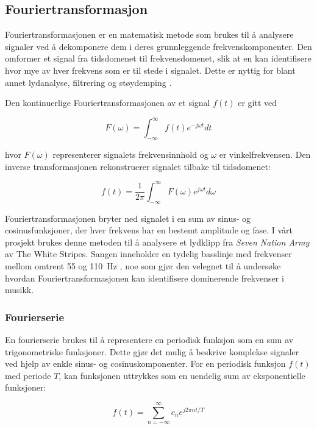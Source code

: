 \subsection{Fouriertransformasjon}

Fouriertransformasjonen er en matematisk metode som brukes til å analysere 
signaler ved å dekomponere dem i deres grunnleggende frekvenskomponenter. 
Den omformer et signal fra tidsdomenet til frekvensdomenet, slik at en kan 
identifisere hvor mye av hver frekvens som er til stede i signalet. Dette er 
nyttig for blant annet lydanalyse, filtrering og støydemping \parencite{geeksforgeeks_fourier}.

Den kontinuerlige Fouriertransformasjonen av et signal $f(t)$ er gitt ved

\begin{equation*}
    F(\omega) = \int_{-\infty}^{\infty} f(t)e^{-j\omega t}dt
\end{equation*}

hvor $F(\omega)$ representerer signalets frekvensinnhold og $\omega$ er 
vinkelfrekvensen. Den inverse transformasjonen rekonstruerer signalet tilbake til tidsdomenet:

\begin{equation*}
    f(t) = \frac{1}{2\pi} \int_{-\infty}^{\infty} F(\omega)e^{j\omega t}d\omega
\end{equation*}

Fouriertransformasjonen bryter ned signalet i en sum av sinus- og cosinusfunksjoner, 
der hver frekvens har en bestemt amplitude og fase. I vårt prosjekt brukes denne metoden 
til å analysere et lydklipp fra \textit{Seven Nation Army} av The White Stripes. 
Sangen inneholder en tydelig basslinje med frekvenser mellom omtrent 55 og 110~Hz \parencite{sevennationarmywiki}, 
noe som gjør den velegnet til å undersøke hvordan Fouriertransformasjonen kan identifisere 
dominerende frekvenser i musikk.

\subsubsection{Fourierserie}
En fourierserie brukes til å representere en periodisk funksjon som en sum av 
trigonometriske funksjoner. Dette gjør det mulig å beskrive komplekse signaler 
ved hjelp av enkle sinus- og cosinuskomponenter. For en periodisk funksjon $f(t)$ 
med periode $T$, kan funksjonen uttrykkes som en uendelig sum av eksponentielle funksjoner:

\begin{equation*}
    f(t) = \sum_{n=-\infty}^{\infty} c_n e^{j2\pi n t/T}
\end{equation*}

